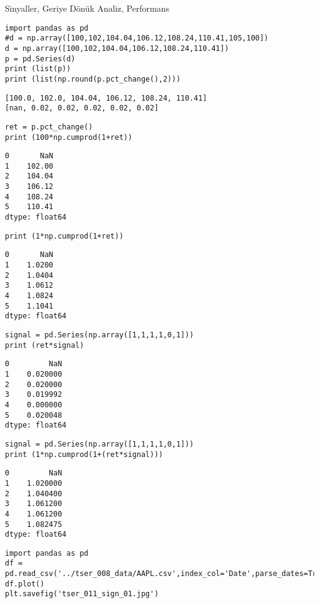 \documentclass[12pt,fleqn]{article}\usepackage{../../common}
\begin{document}
Sinyaller, Geriye Dönük Analiz, Performans

\begin{verbatim}
import pandas as pd
#d = np.array([100,102,104.04,106.12,108.24,110.41,105,100])
d = np.array([100,102,104.04,106.12,108.24,110.41])
p = pd.Series(d)
print (list(p))
print (list(np.round(p.pct_change(),2)))
\end{verbatim}

\begin{verbatim}
[100.0, 102.0, 104.04, 106.12, 108.24, 110.41]
[nan, 0.02, 0.02, 0.02, 0.02, 0.02]
\end{verbatim}

\begin{verbatim}
ret = p.pct_change()
print (100*np.cumprod(1+ret))
\end{verbatim}

\begin{verbatim}
0       NaN
1    102.00
2    104.04
3    106.12
4    108.24
5    110.41
dtype: float64
\end{verbatim}

\begin{verbatim}
print (1*np.cumprod(1+ret))
\end{verbatim}

\begin{verbatim}
0       NaN
1    1.0200
2    1.0404
3    1.0612
4    1.0824
5    1.1041
dtype: float64
\end{verbatim}


\begin{verbatim}
signal = pd.Series(np.array([1,1,1,1,0,1]))
print (ret*signal)
\end{verbatim}

\begin{verbatim}
0         NaN
1    0.020000
2    0.020000
3    0.019992
4    0.000000
5    0.020048
dtype: float64
\end{verbatim}

\begin{verbatim}
signal = pd.Series(np.array([1,1,1,1,0,1]))
print (1*np.cumprod(1+(ret*signal)))
\end{verbatim}

\begin{verbatim}
0         NaN
1    1.020000
2    1.040400
3    1.061200
4    1.061200
5    1.082475
dtype: float64
\end{verbatim}


\begin{verbatim}
import pandas as pd
df = pd.read_csv('../tser_008_data/AAPL.csv',index_col='Date',parse_dates=True)
df.plot()
plt.savefig('tser_011_sign_01.jpg')
\end{verbatim}
\end{document}
